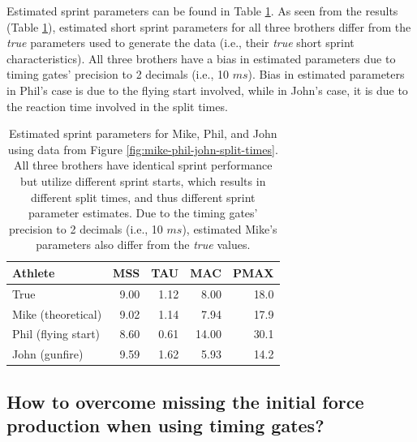 \documentclass[fleqn,10pt]{wlpeerj} %
\begin{document}
Estimated sprint parameters can be found in Table \ref{tab:mike-phil-john-est-params}. As seen from the results (Table \ref{tab:mike-phil-john-est-params}), estimated short sprint parameters for all three brothers differ from the \emph{true} parameters used to generate the data (i.e., their \emph{true} short sprint characteristics). All three brothers have a bias in estimated parameters due to timing gates' precision to 2 decimals (i.e., 10 \(ms\)). Bias in estimated parameters in Phil's case is due to the flying start involved, while in John's case, it is due to the reaction time involved in the split times.



\begin{table}

\caption{\label{tab:mike-phil-john-est-params}Estimated sprint parameters for Mike, Phil, and John using data from Figure \ref{fig:mike-phil-john-split-times}. All three brothers have identical sprint performance but utilize different sprint starts, which results in different split times, and thus different sprint parameter estimates. Due to the timing gates' precision to 2 decimals (i.e., 10 \(ms\)), estimated Mike's parameters also differ from the \emph{true} values.}
\centering
\begin{tabular}[t]{lrrrr}
\toprule
Athlete & MSS & TAU & MAC & PMAX\\
\midrule
True & 9.00 & 1.12 & 8.00 & 18.0\\
Mike (theoretical) & 9.02 & 1.14 & 7.94 & 17.9\\
Phil (flying start) & 8.60 & 0.61 & 14.00 & 30.1\\
John (gunfire) & 9.59 & 1.62 & 5.93 & 14.2\\
\bottomrule
\end{tabular}
\end{table}

\hypertarget{how-to-overcome-missing-the-initial-force-production-when-using-timing-gates}{%
\subsection{How to overcome missing the initial force production when using timing gates?}\label{how-to-overcome-missing-the-initial-force-production-when-using-timing-gates}}
\end{document}
